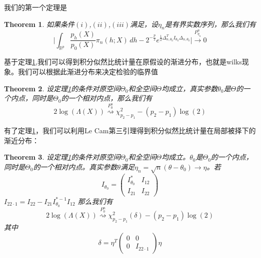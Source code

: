 \documentclass[review]{elsarticle}
\newtheorem{theorem}{Theorem}
\begin{document}
我们的第一个定理是
\begin{theorem}\label{theoremMain}
    如果条件$(i)$,$(ii)$,$(iii)$满足，设$\eta_n$是有界实数序列，那么我们有
    \begin{equation}
        \Big|\int_{\mathbb{R}^{p}}\frac{p_h(X)}{p_0(X)}\pi_n(h;X)\,dh-
        2^{-\frac{p}{2}}e^{\frac{1}{2}\Delta_{n,\theta_0}^TI_{\theta_0}\Delta_{n,\theta_0}}
        \Big|\xrightarrow{P_{\eta_n}^n}0
    \end{equation}
\end{theorem}
基于定理\ref{theoremMain},我们可以得到积分似然比统计量在原假设的渐进分布，也就是wilks现象。我们可以根据此渐进分布来决定检验的临界值
\begin{theorem}\label{theoremWilks}
    设定理\ref{theoremMain}的条件对原空间$\Theta_0$和全空间$\Theta$均成立，真实参数$\theta_0$是$\Theta$的一个内点，同时是$\Theta_0$的一个相对内点，那么我们有
\begin{equation}
    2\log(\Lambda(X))\overset{P_0^n}{\rightsquigarrow} \chi^2_{p_2-p_1}-(p_2-p_1)\log(2)
\end{equation}

\end{theorem}


有了定理\ref{theoremMain}，我们可以利用Le Cam第三引理得到积分似然比统计量在局部被择下的渐近分布：
\begin{theorem}   \label{theoremPower}
    设定理\ref{theoremMain}的条件对原空间$\Theta_0$和全空间$\Theta$均成立。$\theta_0$是$\Theta_0$的一个内点，同时是$\Theta_0$的一个相对内点。真实参数$\theta$满足$\eta_n=\sqrt{n}(\theta-\theta_0)\to \eta$。若
\begin{equation}
    I_{\theta_0}=\left(
        \begin{matrix}
            I^*_{\theta_0}&I_{12}
            \\
            I_{21}&I_{22}
        \end{matrix}
    \right)
\end{equation}
$I_{22\cdot 1}=I_{22}-I_{21}I_{\theta_0}^{*-1}I_{12}$
    那么我们有
\begin{equation}
    2\log(\Lambda(X))\overset{P_0^n}{\rightsquigarrow} \chi^2_{p_2-p_1}(\delta)-(p_2-p_1)\log(2)
\end{equation}
其中
\begin{equation}
\delta=\eta^T
    \left(
        \begin{matrix}
            0&0\\
            0&I_{22\cdot 1}
        \end{matrix}
    \right)
    \eta
\end{equation}
\end{theorem}
\end{document}
